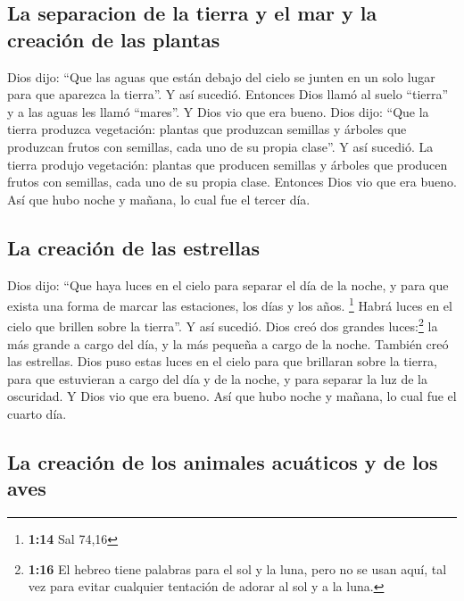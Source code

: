 \hypertarget{la-separacion-de-la-tierra-y-el-mar-y-la-creaciuxf3n-de-las-plantas}{%
\subsection{La separacion de la tierra y el mar y la creación de las
plantas}\label{la-separacion-de-la-tierra-y-el-mar-y-la-creaciuxf3n-de-las-plantas}}

 Dios dijo: ``Que las aguas que están debajo del cielo se
junten en un solo lugar para que aparezca la tierra''. Y así sucedió.
 Entonces Dios llamó al suelo ``tierra'' y a las aguas
les llamó ``mares''. Y Dios vio que era bueno.  Dios
dijo: ``Que la tierra produzca vegetación: plantas que produzcan
semillas y árboles que produzcan frutos con semillas, cada uno de su
propia clase''. Y así sucedió.  La tierra produjo
vegetación: plantas que producen semillas y árboles que producen frutos
con semillas, cada uno de su propia clase. Entonces Dios vio que era
bueno.  Así que hubo noche y mañana, lo cual fue el
tercer día.

\hypertarget{la-creaciuxf3n-de-las-estrellas}{%
\subsection{La creación de las
estrellas}\label{la-creaciuxf3n-de-las-estrellas}}

 Dios dijo: ``Que haya luces en el cielo para separar el
día de la noche, y para que exista una forma de marcar las estaciones,
los días y los años. \footnote{\textbf{1:14} Sal 74,16} 
Habrá luces en el cielo que brillen sobre la tierra''. Y así sucedió.
 Dios creó dos grandes luces:\footnote{\textbf{1:16} El
  hebreo tiene palabras para el sol y la luna, pero no se usan aquí, tal
  vez para evitar cualquier tentación de adorar al sol y a la luna.} la
más grande a cargo del día, y la más pequeña a cargo de la noche.
También creó las estrellas.  Dios puso estas luces en el
cielo para que brillaran sobre la tierra,  para que
estuvieran a cargo del día y de la noche, y para separar la luz de la
oscuridad. Y Dios vio que era bueno.  Así que hubo noche
y mañana, lo cual fue el cuarto día.

\hypertarget{la-creaciuxf3n-de-los-animales-acuuxe1ticos-y-de-los-aves}{%
\subsection{La creación de los animales acuáticos y de los
aves}\label{la-creaciuxf3n-de-los-animales-acuuxe1ticos-y-de-los-aves}}

